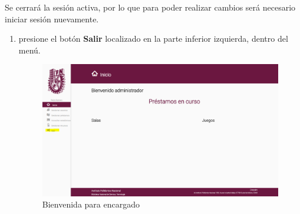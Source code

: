 Se cerrará la sesión activa, por lo que para poder realizar
cambios será necesario iniciar sesión nuevamente.
\begin{enumerate}
	\item presione el botón \textbf{Salir} localizado
		en la parte inferior izquierda, dentro del menú.

	\begin{figure}[hbtp]
		
		\includegraphics[scale=0.3]{images/Interfaz/IUGS10_logout.png}
		\caption{Bienvenida para encargado}
	\end{figure}
		
		
\end{enumerate}
